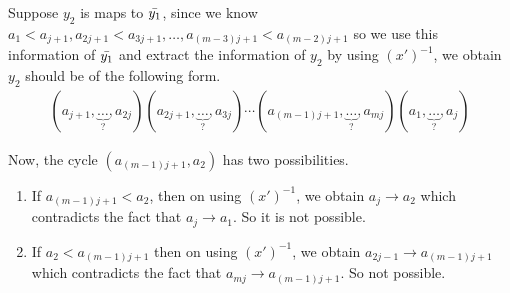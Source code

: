 \documentclass[oneside]{amsart}
\theoremstyle{plain}
\theoremstyle{definition}
\theoremstyle{remark}
\begin{document}
\begin{enumerate}
\begin{enumerate}
                Suppose $y_2$ is maps to $\Bar{y_1}$, since we know $a_1 < a_{j + 1}, a_{2j + 1}< a_{3j + 1}, \ldots, a_{(m - 3)j + 1}< a_{(m - 2)j + 1}$ so we use this information of $\Bar{y_1}$ and extract the information of $y_2$ by using $(x')^{-1}$, we obtain $y_2$ should be of the following form.
                \begin{align*}
                    (a_{j +1}, \underbrace{\ldots}_{?}, a_{2j})(a_{2j + 1},\underbrace{\ldots}_{?}, a_{3j})\cdots (a_{(m - 1) j + 1}, \underbrace{\ldots}_{?}, a_{mj})(a_1, \underbrace{\ldots}_{?}, a_j)
                \end{align*}
                
                Now, the cycle $(a_{(m - 1)j + 1}, a_2)$ has two possibilities.
                \begin{enumerate}
                    \item If $a_{(m - 1)j + 1}< a_2$, then on using $(x')^{-1}$, we obtain $a_j \to a_2$ which contradicts the fact that $a_j \to a_1$. So it is not possible.
                    \item If $a_2 < a_{(m - 1)j + 1}$ then on using $(x')^{-1}$, we obtain $a_{2j - 1} \to a_{(m - 1)j + 1}$ which contradicts the fact that $a_{mj} \to a_{(m - 1)j + 1}$. So not possible.
                \end{enumerate}
                

\end{enumerate}
\end{enumerate}
\end{document}
